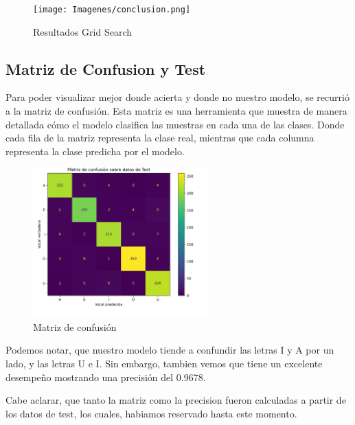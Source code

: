 \documentclass[10pt,a4paper]{article}
\begin{document}
\begin{figure}[h]
  \centering
  \texttt{[image: Imagenes/conclusion.png]}
  \caption{Resultados Grid Search}
  \label{fig:Tabla 1}
\end{figure}


\subsection{Matriz de Confusion y Test}

Para poder visualizar mejor donde acierta y donde no nuestro modelo, se recurrió a la matriz de confusión. Esta matriz es una herramienta que muestra de manera detallada cómo el modelo clasifica las muestras en cada una de las clases. Donde cada fila de la matriz representa la clase real, mientras que cada columna representa la clase predicha por el modelo.

\begin{figure}[ht]
  \centering
  \includegraphics[width=0.6\textwidth]{Imagenes/matriz_confusion_arbol.png}
  \caption{Matriz de confusión}
  \label{fig:Tabla 1}
\end{figure}

Podemos notar, que nuestro modelo tiende a confundir las letras I y A por un lado, y las letras U e I. Sin embargo, tambien vemos que tiene un excelente desempeño mostrando una precisión del 0.9678.

Cabe aclarar, que tanto la matriz como la precision fueron calculadas a partir de los datos de test, los cuales, habiamos reservado hasta este momento.
\end{document}
